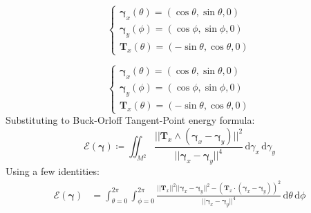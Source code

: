 \documentclass{beamer}
\theoremstyle{remark}
\newcommand{\gammabf}{\boldsymbol{\gamma}}
\newcommand{\intd}{\, \text{d}}
\newcommand{\norm}[1]{\lvert \lvert #1 \rvert \rvert}
\begin{document}
\begin{frame}
\begin{example}
{            \begin{equation*}
                \begin{cases}
                    \gammabf_x \left( \theta \right) = \left( \cos{\theta}, \sin{\theta}, 0 \right) \\
                    \gammabf_y \left( \phi \right) = \left( \cos{\phi}, \sin{\phi}, 0 \right) \\
                    \mathbf{T}_x \left( \theta \right) = \left( -\sin{\theta}, \cos{\theta}, 0 \right)
                \end{cases}
            \end{equation*}
        }
    \end{example}
\end{frame}

\begin{frame}
    \begin{example}[Cont.]
            \begin{equation*}
                \begin{cases}
                    \gammabf_x \left( \theta \right) = \left( \cos{\theta}, \sin{\theta}, 0 \right) \\
                    \gammabf_y \left( \phi \right) = \left( \cos{\phi}, \sin{\phi}, 0 \right) \\
                    \mathbf{T}_x \left( \theta \right) = \left( -\sin{\theta}, \cos{\theta}, 0 \right)
                \end{cases}
            \end{equation*}
            Substituting to Buck-Orloff Tangent-Point energy formula:
        \begin{equation*}
            \mathcal{E} \left( \gammabf \right) \coloneqq \iint_{M^2} \frac{\norm{\mathbf{T}_x \wedge \left( \gammabf_x - \gammabf_y \right)}^{2}}{\norm{\gammabf_x - \gammabf_y}^{4}} \intd \gamma_x \intd \gamma_y
        \end{equation*}
        {
            Using a few identities:
            \begin{align*}
                \mathcal{E} \left( \gammabf \right) &= \int_{\theta=0}^{2 \pi} \int_{\phi=0}^{2 \pi}
                \frac{\norm{\mathbf{T}_x}^2 \norm{\gammabf_x - \gammabf_y}^2 - \left( \mathbf{T}_x \cdot \left( \gammabf_x -\gammabf_y \right) \right)^2}{\norm{\gammabf_x - \gammabf_y}^4} \intd \theta \intd \phi
            \end{align*}
        }
    \end{example}
\end{frame}
\end{document}
